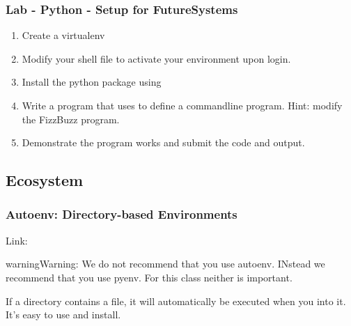 \subsubsection{Lab - Python - Setup for FutureSystems}
\label{\detokenize{lesson/prg/python_intro:lab-python-2}}\label{\detokenize{lesson/prg/python_intro:lab-python-setup-for-futuresystems}}\begin{enumerate}
\item {} 
Create a virtualenv 

\item {} 
Modify your  shell file to activate your environment
upon login.

\item {} 
Install the  python package using 

\item {} 
Write a program that uses  to define a commandline
program. Hint: modify the FizzBuzz program.

\item {} 
Demonstrate the program works and submit the code and output.

\end{enumerate}


\subsection{Ecosystem}
\label{\detokenize{lesson/prg/python_intro:ecosystem}}

\subsubsection{Autoenv: Directory-based Environments}
\label{\detokenize{lesson/prg/python_intro:autoenv}}\label{\detokenize{lesson/prg/python_intro:autoenv-directory-based-environments}}
Link: 

\begin{sphinxadmonition}{warning}{Warning:}
We do not recommend that you use autoenv. INstead we
recommend that you use pyenv. For this class neither is
important.
\end{sphinxadmonition}

If a directory contains a  file, it will automatically be executed
when you  into it. It's easy to use and install.

